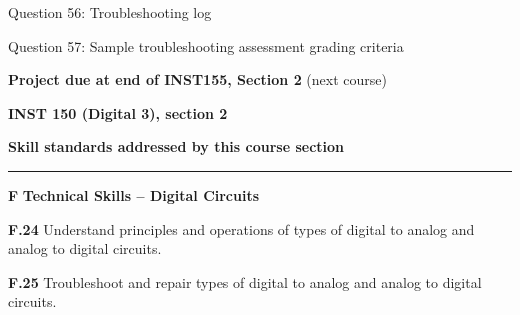 \hskip 10pt Question 56: Troubleshooting log

\hskip 10pt Question 57: Sample troubleshooting assessment grading criteria
 
\hskip 10pt {\bf Project due at end of INST155, Section 2} (next course)

\vskip 10pt











\vfil \eject

\centerline{\bf INST 150 (Digital 3), section 2} \bigskip 
 
\vskip 10pt

\noindent
{\bf Skill standards addressed by this course section}

\vskip 5pt

\hrule \vskip 10pt
\noindent
{}

\vskip 5pt

\medskip
\item{\bf F} {\bf Technical Skills -- Digital Circuits}
\item{\bf F.24} Understand principles and operations of types of digital to analog and analog to digital circuits.
\item{\bf F.25} Troubleshoot and repair types of digital to analog and analog to digital circuits.

\medskip

\vskip 5pt

